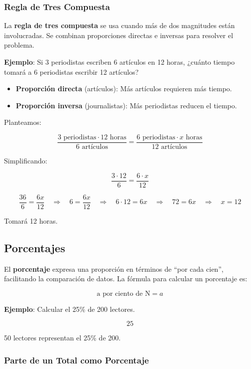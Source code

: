 \documentclass[
  stu,
  floatsintext,
  longtable,
  a4paper,
  nolmodern,
  notxfonts,
  notimes,
  colorlinks=true,linkcolor=blue,citecolor=blue,urlcolor=blue]{apa7}
\providecommand{\tightlist}{%
  \setlength{\itemsep}{0pt}\setlength{\parskip}{0pt}}
\begin{document}
\subsubsection{Regla de Tres Compuesta}\label{regla-de-tres-compuesta}

La \textbf{regla de tres compuesta} se usa cuando más de dos magnitudes
están involucradas. Se combinan proporciones directas e inversas para
resolver el problema.

\textbf{Ejemplo}: Si 3 periodistas escriben 6 artículos en 12 horas,
¿cuánto tiempo tomará a 6 periodistas escribir 12 artículos?

\begin{itemize}
\tightlist
\item
  \textbf{Proporción directa} (artículos): Más artículos requieren más
  tiempo.
\item
  \textbf{Proporción inversa} (journalistas): Más periodistas reducen el
  tiempo.
\end{itemize}

Planteamos:

\[
\frac{3 \text{ periodistas} \cdot 12 \text{ horas}}{6 \text{ artículos}} = \frac{6 \text{ periodistas} \cdot x \text{ horas}}{12 \text{ artículos}}
\]

Simplificando:

\[
\frac{3 \cdot 12}{6} = \frac{6 \cdot x}{12}
\]

\[
\frac{36}{6} = \frac{6x}{12} \quad \Rightarrow \quad 6 = \frac{6x}{12} \quad \Rightarrow \quad 6 \cdot 12 = 6x \quad \Rightarrow \quad 72 = 6x \quad \Rightarrow \quad x = 12
\]

Tomará 12 horas.

\subsection{Porcentajes}\label{porcentajes}

El \textbf{porcentaje} expresa una proporción en términos de ``por cada
cien'', facilitando la comparación de datos. La fórmula para calcular un
porcentaje es:

\[
\text{a por ciento de N} = a%
\]

\textbf{Ejemplo}: Calcular el 25\% de 200 lectores.

\[
25%
\]

50 lectores representan el 25\% de 200.

\subsubsection{Parte de un Total como
Porcentaje}\label{parte-de-un-total-como-porcentaje}
\end{document}
